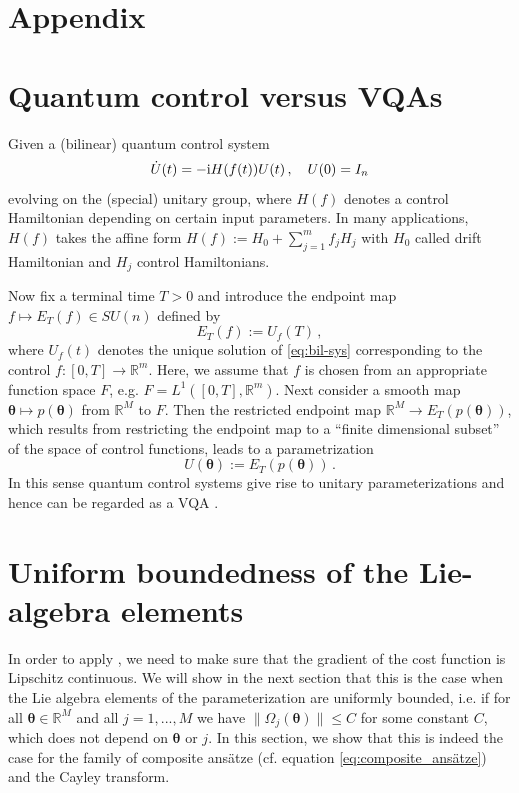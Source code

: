 \documentclass{article}
\renewcommand{\vec}[1]{\ensuremath{\boldsymbol{#1}}}
\begin{document}
\printbibliography

\appendix
\section*{Appendix}

\section{Quantum control versus VQAs}
\label{sec:QC_vs_QVAs}

Given a (bilinear) quantum control system
\begin{equation}
\label{eq:bil-sys}
\dot{U}(t) = - {\rm i}H(f(t))U(t)\,, \quad U(0) = I_n
\end{equation}
evolving on the (special) unitary group, where $H(f)$ denotes a control Hamiltonian depending on certain input parameters. %
In many applications, $H(f)$ takes the affine form 
$H(f) := H_0 + \sum_{j=1}^m f_j H_j$ with $H_0$ called drift Hamiltonian
and $H_j$ control Hamiltonians.

Now fix a terminal time $T >0$ and introduce the endpoint map 
$f \mapsto E_T(f) \in SU(n)$ defined by
\begin{equation}
E_T(f) := U_f(T)\,,
\end{equation}
where $U_f(t)$ denotes the unique solution of \eqref{eq:bil-sys} 
corresponding to the control $f:[0,T] \to \mathbb{R}^m$. Here, we assume that $f$ is chosen from an appropriate function space $F$, e.g. $F = L^1([0,T],\mathbb{R}^m)$. Next consider a smooth map $\vec{\theta} \mapsto p(\vec{\theta})$ from $\mathbb{R}^M$ to $F$.
Then the restricted endpoint map $\mathbb{R}^M \to E_T(p(\vec{\theta}))$, which results from restricting the endpoint map to a ``finite dimensional subset'' of the space of control functions, leads to a parametrization
\begin{equation}
U(\vec{\theta}):= E_T(p(\vec{\theta}))\,.
\end{equation}
In this sense quantum control systems give rise to unitary parameterizations and hence can be regarded as a \gls{VQA} \cite{PRXQuantum.2.010101}.

\section{Uniform boundedness of the Lie-algebra elements}
\label{sec:lipschitz}
In order to apply , we need to make sure that the gradient of the cost function is Lipschitz continuous.
We will show in the next section that this is the case when the Lie algebra elements of the parameterization are uniformly bounded, i.e. if for all \(\vec{\theta} \in \mathds{R}^M\) and all \(j=1,...,M\) we have \(\lVert \Omega_j(\vec{\theta}) \rVert \leq C\) for some constant \(C\), which does not depend on \(\vec{\theta}\) or \(j\).
In this section, we show that this is indeed the case for the family of composite ansätze (cf. equation \eqref{eq:composite_ansätze}) and the Cayley transform.
\end{document}
